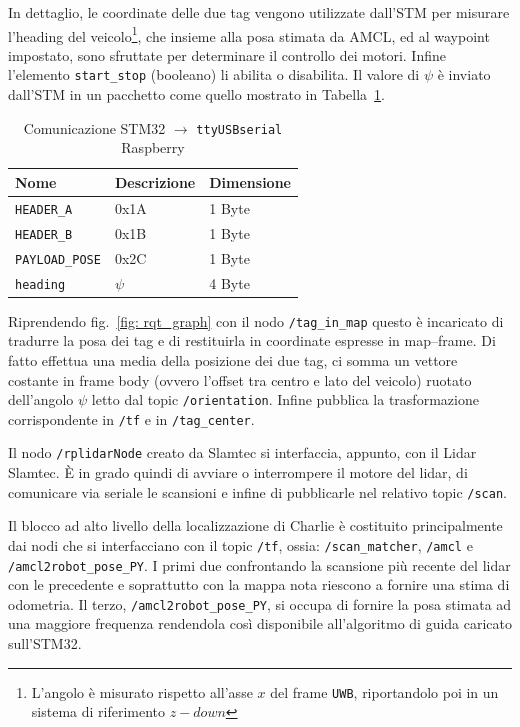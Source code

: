 In dettaglio, le coordinate delle due tag vengono utilizzate dall'STM per misurare l'heading del veicolo\footnote{L'angolo è misurato rispetto all'asse $x$ del frame \texttt{UWB}, riportandolo poi in un sistema di riferimento $z-down$}, che insieme alla posa stimata da AMCL, ed al waypoint impostato, sono sfruttate per determinare il controllo dei motori. Infine l'elemento \verb!start_stop! (booleano) li abilita o disabilita.
Il valore di $\psi$ è inviato dall'STM in un pacchetto come quello mostrato in Tabella~\ref{tab: comunicazione_stm2seriale}.

\begin{table}[h]
	\centering
	\label{tab: comunicazione_stm2seriale}
	\begin{tabular}{lll}
		\hline
		Nome                     & Descrizione   & Dimensione\\
		\hline
		\verb!HEADER_A!          & 0x1A          & 1 Byte\\
		\verb!HEADER_B!          & 0x1B          & 1 Byte\\
		\verb!PAYLOAD_POSE!      & 0x2C          & 1 Byte\\
		\hline
		\verb!heading!           & $\psi$         & 4 Byte\\
		\hline
	\end{tabular}
	\caption{Comunicazione STM32 $\rightarrow$ \texttt{ttyUSBserial} Raspberry}
\end{table}

\vspace{0.5mm}
Riprendendo fig.~\ref{fig: rqt_graph} con il nodo \verb|/tag_in_map| questo \`e incaricato di tradurre la posa dei tag e di restituirla in coordinate espresse in map--frame. 
Di fatto effettua una media della posizione dei due tag, ci somma un vettore costante in frame body (ovvero l'offset tra centro e lato del veicolo) ruotato dell'angolo $\psi$ letto dal topic \verb|/orientation|.
Infine pubblica la trasformazione corrispondente in \verb|/tf| e in \verb|/tag_center|.

\vspace{0.5mm}
Il nodo \verb|/rplidarNode| creato da Slamtec si interfaccia, appunto, con il Lidar Slamtec. 
\`E in grado quindi di avviare o interrompere il motore del lidar, di comunicare via seriale le scansioni e infine di pubblicarle nel relativo topic \verb|/scan|.

\vspace{0.5mm}
Il blocco ad alto livello della localizzazione di Charlie \`e costituito principalmente dai nodi che si interfacciano con il topic \verb|/tf|, ossia: \verb|/scan_matcher|, \verb|/amcl| e \verb|/amcl2robot_pose_PY|.
I primi due confrontando la scansione pi\`u recente del lidar con le precedente e soprattutto con la mappa nota riescono a fornire una stima di odometria. Il terzo, \verb|/amcl2robot_pose_PY|, si occupa di fornire la posa stimata ad una maggiore frequenza rendendola cos\`i disponibile all'algoritmo di guida caricato sull'STM32.

